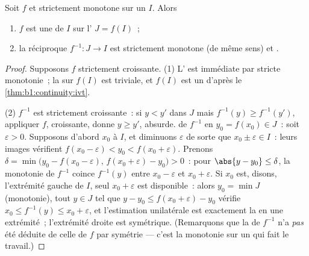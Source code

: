 \begin{theorem}\label{thm:b1:continuity:bijection}
Soit $f$  et strictement monotone sur un  $I$. Alors
\begin{enumerate}
  \item $f$ est une  de $I$ sur l' $J = f(I)$~;
  \item la réciproque $f^{-1} \colon J \to I$ est strictement monotone
        (de même sens) et \emph{}.
\end{enumerate}
\end{theorem}

\begin{proof}
Supposons $f$ strictement croissante. (1) L' est immédiate
par stricte monotonie~; la  sur $f(I)$ est triviale, et
$f(I)$ est un  d'après le \cref{thm:b1:continuity:ivt}.

(2) $f^{-1}$ est strictement croissante~: si $y < y'$ dans $J$ mais
$f^{-1}(y) \geq f^{-1}(y')$, appliquer $f$, croissante, donne $y \geq
y'$, absurde.  de $f^{-1}$ en $y_0 = f(x_0) \in J$~: soit
$\varepsilon > 0$. Supposons d'abord $x_0$  à $I$, et
diminuons $\varepsilon$ de sorte que $x_0 \pm \varepsilon \in I$~:
leurs images vérifient $f(x_0 - \varepsilon) < y_0 < f(x_0 +
\varepsilon)$. Prenons
$\delta = \min\bigl(y_0 - f(x_0 - \varepsilon),\, f(x_0 +
\varepsilon) - y_0\bigr) > 0$~: pour $\abs{y - y_0} \leq \delta$, la
monotonie de $f^{-1}$ coince $f^{-1}(y)$ entre $x_0 -
\varepsilon$ et $x_0 + \varepsilon$. Si $x_0$ est, disons,
l'extrémité gauche de $I$, seul $x_0 + \varepsilon$ est disponible~:
alors $y_0 = \min J$ (monotonie), tout $y \in J$ tel que $y - y_0
\leq f(x_0 + \varepsilon) - y_0$ vérifie $x_0 \leq f^{-1}(y)
\leq x_0 + \varepsilon$, et l'estimation unilatérale est exactement
la  en une extrémité~; l'extrémité droite est symétrique.
(Remarquons que la  de $f^{-1}$
n'a \emph{pas} été déduite de celle de $f$ par symétrie --- c'est la
monotonie sur un  qui fait le travail.)
\end{proof}


